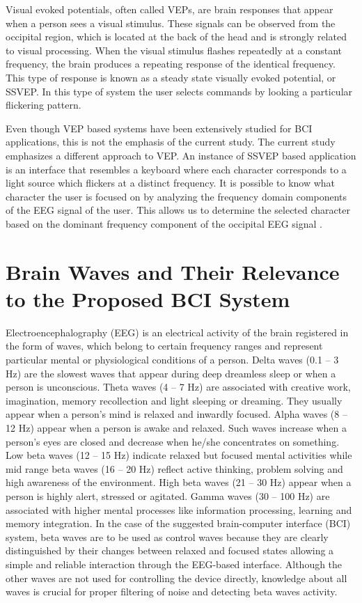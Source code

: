 Visual evoked potentials, often called VEPs, are brain responses that appear when a person sees a visual stimulus. These signals can be observed from the occipital region, which is located at the back of the head and is strongly related to visual processing. When the visual stimulus flashes repeatedly at a constant frequency, the brain produces a repeating response of the identical frequency. This type of response is known as a steady state visually evoked potential, or SSVEP. In this type of system the user selects commands by looking a particular flickering pattern.

Even though VEP based systems have been extensively studied for BCI applications, this is not the emphasis of the current study. The current study emphasizes a different approach to VEP. An instance of SSVEP based application is an interface that resembles a keyboard where each character corresponds to a light source which flickers at a distinct frequency. It is possible to know what character the user is focused on by analyzing the frequency domain components of the EEG signal of the user. This allows us to determine the selected character based on the dominant frequency component of the occipital EEG signal  \cite{hwang2012ssvep}.


\section{Brain Waves and Their Relevance to the Proposed BCI System}
Electroencephalography (EEG) is an electrical activity of the brain registered in the form of waves, which belong to certain frequency ranges and represent particular mental or physiological conditions of a person. Delta waves (0.1 – 3 Hz) are the slowest waves that appear during deep dreamless sleep or when a person is unconscious. Theta waves (4 – 7 Hz) are associated with creative work, imagination, memory recollection and light sleeping or dreaming. They usually appear when a person's mind is relaxed and inwardly focused. Alpha waves (8 – 12 Hz) appear when a person is awake and relaxed. Such waves increase when a person's eyes are closed and decrease when he/she concentrates on something. Low beta waves (12 – 15 Hz) indicate relaxed but focused mental activities while mid range beta waves (16 – 20 Hz) reflect active thinking, problem solving and high awareness of the environment. High beta waves (21 – 30 Hz) appear when a person is highly alert, stressed or agitated. Gamma waves (30 – 100 Hz) are associated with higher mental processes like information processing, learning and memory integration. In the case of the suggested brain-computer interface (BCI) system, beta waves are to be used as control waves because they are clearly distinguished by their changes between relaxed and focused states allowing a simple and reliable interaction through the EEG-based interface. Although the other waves are not used for controlling the device directly, knowledge about all waves is crucial for proper filtering of noise and detecting beta waves activity.

